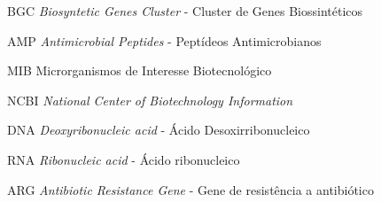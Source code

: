 \listoffigures*
\cleardoublepage

\listoftables*
\cleardoublepage

\begin{siglas}
	\item[BGC] \textit{Biosyntetic Genes Cluster } - Cluster de Genes Biossintéticos
  \item[AMP] \textit{Antimicrobial Peptides} - Peptídeos Antimicrobianos
  \item[MIB] Microrganismos de Interesse Biotecnológico
  \item[NCBI] \textit{National Center of Biotechnology Information}
  \item[DNA] \textit{Deoxyribonucleic acid} - Ácido Desoxirribonucleico
  \item[RNA] \textit{Ribonucleic acid} - Ácido ribonucleico
  \item[ARG] \textit{Antibiotic Resistance Gene} - Gene de resistência a antibiótico
\end{siglas}
